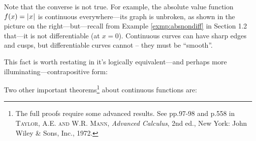 \par Note that the converse is not true. For example, the absolute value
function $f(x) = \lvert\mspace{1mu}x\mspace{1mu}\rvert$ is continuous everywhere---its graph is unbroken, as
shown in the picture on the right---but---recall from Example
\ref{exmp:absnondiff} in Section 1.2 that---it is not differentiable (at $x = 0$).
Continuous curves can have sharp edges and cusps, but differentiable curves
cannot -- they must be ``smooth''.

This fact is worth restating in it's logically equivalent---and perhaps more illuminating---contrapositive form:


Two other important theorems\footnote{The full proofs require some advanced
results. See pp.97-98 and p.558 in \textsc{Taylor, A.E. and W.R. Mann},
\emph{Advanced Calculus}, 2nd ed., New York: John Wiley \& Sons, Inc., 1972.}
about continuous functions are:


\vspace{-3mm}

